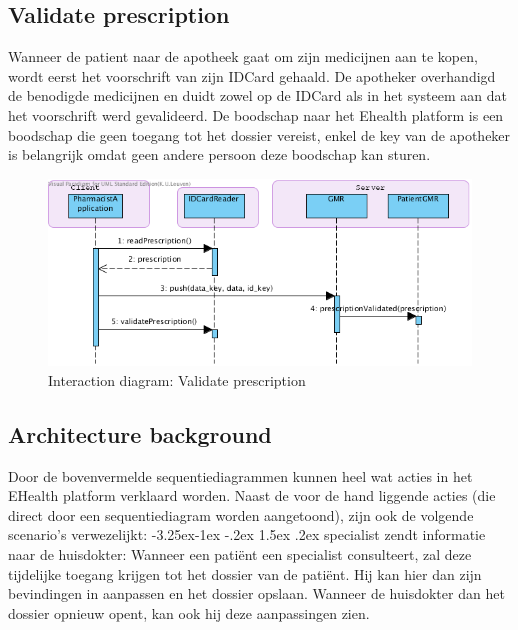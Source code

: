 \documentclass[a4paper,10pt]{article}
\makeatletter
\renewcommand\paragraph{\@startsection{paragraph}{4}{\z@}%
  {-3.25ex\@plus -1ex \@minus -.2ex}%
  {1.5ex \@plus .2ex}%
  {\normalfont\normalsize\bfseries}}
\makeatother
\begin{document}
\subsection{Validate prescription}
\label{interaction:validatePrescription}
Wanneer de patient naar de apotheek gaat om zijn medicijnen aan te kopen, wordt eerst het voorschrift van zijn IDCard gehaald. De apotheker overhandigd de benodigde medicijnen en duidt zowel op de IDCard als in het systeem aan dat het voorschrift werd gevalideerd. De boodschap naar het Ehealth platform is een boodschap die geen toegang tot het dossier vereist, enkel de key van de apotheker is belangrijk omdat geen andere persoon deze boodschap kan sturen.

\begin{figure}[!h]
  \includegraphics[width=\textwidth]{../images/validatePrescription.png}
  \caption{Interaction diagram: Validate prescription}
\end{figure}


\subsection{Architecture background}

Door de bovenvermelde sequentiediagrammen kunnen heel wat acties in het EHealth platform verklaard worden. 
Naast de voor de hand liggende acties (die direct door een sequentiediagram worden aangetoond), zijn ook de volgende scenario's verwezelijkt: 
\paragraph{specialist zendt informatie naar de huisdokter:}
Wanneer een patiënt een specialist consulteert, zal deze tijdelijke toegang krijgen tot het dossier van de patiënt. Hij kan hier dan zijn bevindingen in aanpassen en het dossier opslaan. Wanneer de huisdokter dan het dossier opnieuw opent, kan ook hij deze aanpassingen zien. 
\end{document}
